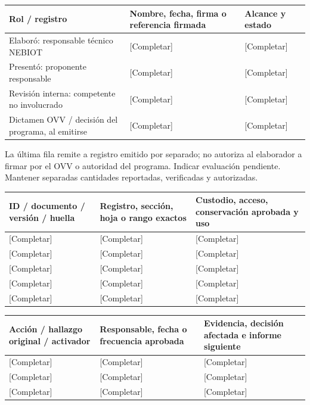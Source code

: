 {\sffamily\fontsize{8.6}{10.7}\selectfont\begin{longtable}{@{}P{48mm}P{61mm}P{53mm}@{}}
\toprule
\textbf{Rol / registro} & \textbf{Nombre, fecha, firma o referencia firmada} & \textbf{Alcance y estado}\\\midrule\endhead
\rule{0pt}{8mm}Elaboró: responsable técnico NEBIOT & [Completar] & [Completar]\\\hline
\rule{0pt}{8mm}Presentó: proponente responsable & [Completar] & [Completar]\\\hline
\rule{0pt}{8mm}Revisión interna: competente no involucrado & [Completar] & [Completar]\\\hline
\rule{0pt}{8mm}Dictamen OVV / decisión del programa, al emitirse & [Completar] & [Completar]\\\hline
\end{longtable}}
La última fila remite a registro emitido por separado; no autoriza al elaborador a firmar por el OVV o autoridad del programa. Indicar evaluación pendiente. Mantener separadas cantidades reportadas, verificadas y autorizadas.\par
{}
{\sffamily\fontsize{8.6}{10.7}\selectfont\begin{longtable}{@{}P{48mm}P{61mm}P{53mm}@{}}
\toprule
\textbf{ID / documento / versión / huella} & \textbf{Registro, sección, hoja o rango exactos} & \textbf{Custodio, acceso, conservación aprobada y uso}\\\midrule\endhead
\rule{0pt}{8mm}[Completar] & [Completar] & [Completar]\\\hline
\rule{0pt}{8mm}[Completar] & [Completar] & [Completar]\\\hline
\rule{0pt}{8mm}[Completar] & [Completar] & [Completar]\\\hline
\rule{0pt}{8mm}[Completar] & [Completar] & [Completar]\\\hline
\rule{0pt}{8mm}[Completar] & [Completar] & [Completar]\\\hline
\end{longtable}}
{\sffamily\fontsize{8.6}{10.7}\selectfont\begin{longtable}{@{}P{48mm}P{61mm}P{53mm}@{}}
\toprule
\textbf{Acción / hallazgo original / activador} & \textbf{Responsable, fecha o frecuencia aprobada} & \textbf{Evidencia, decisión afectada e informe siguiente}\\\midrule\endhead
\rule{0pt}{8mm}[Completar] & [Completar] & [Completar]\\\hline
\rule{0pt}{8mm}[Completar] & [Completar] & [Completar]\\\hline
\rule{0pt}{8mm}[Completar] & [Completar] & [Completar]\\\hline
\end{longtable}}
